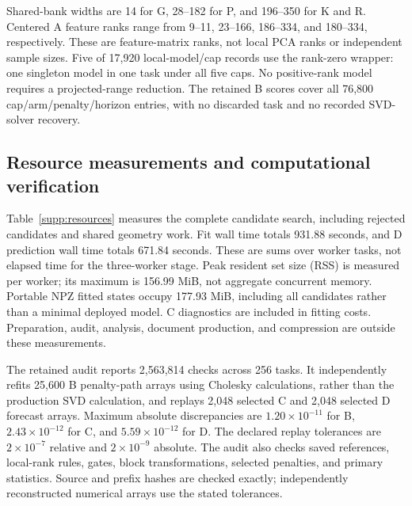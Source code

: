 Shared-bank widths are 14 for G, 28--182 for P, and 196--350 for K and R. Centered A feature ranks range from 9--11, 23--166, 186--334, and 180--334, respectively. These are feature-matrix ranks, not local PCA ranks or independent sample sizes. Five of 17,920 local-model/cap records use the rank-zero wrapper: one singleton model in one task under all five caps. No positive-rank model requires a projected-range reduction. The retained B scores cover all 76,800 cap/arm/penalty/horizon entries, with no discarded task and no recorded SVD-solver recovery.

\begin{table}[htbp]\centering\small
\caption{Cap-selection counts over 256 tasks and ranges of feature width and centered A feature rank. Width excludes the intercept. Shared rows represent the same P-selected bank.}\label{supp:selection}
\end{table}
\begin{table}[htbp]\centering\small
\caption{Cap counts by panel. NL has 192 law/noise/repetition tasks and L has 64; each panel still has 32 independent repetition units.}\label{supp:selectionpanels}
\end{table}
\FloatBarrier

\subsection{Resource measurements and computational verification}
Table~\ref{supp:resources} measures the complete candidate search, including rejected candidates and shared geometry work. Fit wall time totals 931.88 seconds, and D prediction wall time totals 671.84 seconds. These are sums over worker tasks, not elapsed time for the three-worker stage. Peak resident set size (RSS) is measured per worker; its maximum is 156.99 MiB, not aggregate concurrent memory. Portable NPZ fitted states occupy 177.93 MiB, including all candidates rather than a minimal deployed model. C diagnostics are included in fitting costs. Preparation, audit, analysis, document production, and compression are outside these measurements.

The retained audit reports 2,563,814 checks across 256 tasks. It independently refits 25,600 B penalty-path arrays using Cholesky calculations, rather than the production SVD calculation, and replays 2,048 selected C and 2,048 selected D forecast arrays. Maximum absolute discrepancies are $1.20\times10^{-11}$ for B, $2.43\times10^{-12}$ for C, and $5.59\times10^{-12}$ for D. The declared replay tolerances are $2\times10^{-7}$ relative and $2\times10^{-9}$ absolute. The audit also checks saved references, local-rank rules, gates, block transformations, selected penalties, and primary statistics. Source and prefix hashes are checked exactly; independently reconstructed numerical arrays use the stated tolerances.


